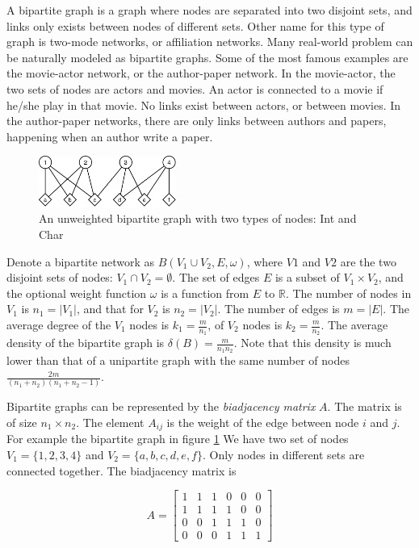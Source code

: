 A bipartite graph is a graph where nodes are separated into two disjoint sets,
and links only exists between nodes of different sets.
Other name for this type of graph is two-mode networks, or affiliation networks.
Many real-world problem can be naturally modeled as bipartite graphs.
Some of the most famous examples are the movie-actor network, or the author-paper network.
In the movie-actor, the two sets of nodes are actors and movies.
An actor is connected to a movie if he/she play in that movie.
No links exist between actors, or between movies.
In the author-paper networks, there are only links between authors and papers,
happening when an author write a paper.

\begin{figure}[H]
	\centering
	\includegraphics[width=0.4\textwidth]{images/unweighted-bipartite.pdf}
	\caption{An unweighted bipartite graph with two types of nodes: Int and Char}
	\label{fig:unweighted-bipartite-graph}
\end{figure}

Denote a bipartite network as $B(V_1 \cup V_2, E, \omega)$,
where $V1$ and $V2$ are the two disjoint sets of nodes: $V_1 \cap V_2 = \emptyset$.
The set of edges $E$ is a subset of $V_1 \times V_2$,
and the optional weight function $\omega$ is a function from $E$ to $\mathbb{R}$.
The number of nodes in $V_1$ is $n_1 = |V_1|$, and that for $V_2$ is $n_2 = |V_2|$.
The number of edges is $m = |E|$.
The average degree of the $V_1$ nodes is $k_1 = \frac{m}{n_1}$, of $V_2$ nodes is $k_2 = \frac{m}{n_2}$.
The average density of the bipartite graph is $\delta(B) = \frac{m}{n_1 n_2}$.
Note that this density is much lower than that of a unipartite graph with the same number of nodes $\frac{2m}{(n_1 + n_2)(n_1 + n_2 - 1)}$.

Bipartite graphs can be represented by the \textit{biadjacency matrix} $A$.
The matrix is of size $n_1 \times n_2$.
The element $A_{ij}$ is the weight of the edge between node $i$ and $j$.
For example the bipartite graph in figure \ref{fig:unweighted-bipartite-graph}
We have two set of nodes $V_1 = \{1, 2, 3, 4\}$ and $V_2 = \{a, b, c, d, e, f\}$.
Only nodes in different sets are connected together.
The biadjacency matrix is

\begin{equation*}
	A =
	\begin{bmatrix}
		1 & 1 & 1 & 0 & 0 & 0 \\
		1 & 1 & 1 & 1 & 0 & 0 \\
		0 & 0 & 1 & 1 & 1 & 0 \\
		0 & 0 & 0 & 1 & 1 & 1
	\end{bmatrix}
\end{equation*}

